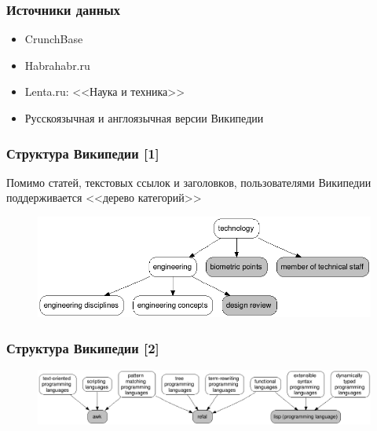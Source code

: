 \documentclass{beamer}
\begin{document}
\begin{frame}\frametitle{Источники данных}

\begin{itemize}
    \item CrunchBase
    \item Habrahabr.ru
    \item Lenta.ru: <<Наука и техника>>
    \item Русскоязычная и англоязычная версии Википедии
\end{itemize}

\end{frame}

\begin{frame}\frametitle{Структура Википедии [1]}
Помимо статей, текстовых ссылок и заголовков, пользователями Википедии поддерживается <<дерево категорий>>

\begin{figure}[ht]
\begin{center}
\includegraphics[width=4.5in]{chart_categories.png}
\end{center}
\end{figure}

\end{frame}
\begin{frame}\frametitle{Структура Википедии [2]}

\begin{figure}[ht]
\begin{center}
\includegraphics[width=4.5in]{chart_languages.png}
\end{center}
\end{figure}
\end{frame}


\end{document}
